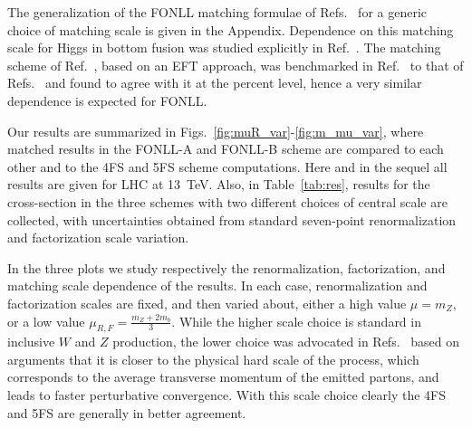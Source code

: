 \documentclass[12pt]{article}
\begin{document}
The generalization of the FONLL matching formulae of
Refs.~\cite{Forte:2015hba,Forte:2016sja} for a generic choice of
matching scale is given in the Appendix.
Dependence on this
matching scale for Higgs in bottom fusion  was studied explicitly in
Ref.~\cite{Bonvini:2015pxa,Bonvini:2016fgf}. The matching scheme of 
Ref.~\cite{Bonvini:2015pxa,Bonvini:2016fgf}, based on an EFT approach,
was benchmarked in Ref.~\cite{deFlorian:2016spz} to that of
Refs.~\cite{Forte:2015hba,Forte:2016sja} and found to agree with it at
the percent level, hence a very similar dependence is expected for
FONLL.


Our results are summarized in
Figs.~\ref{fig:muR_var}-\ref{fig:m_mu_var}, where
matched results in the FONLL-A and FONLL-B scheme are compared to each
other and to the 4FS and 5FS scheme computations. Here and in the
sequel all results are given for LHC at 13~TeV.  Also, in
Table~\ref{tab:res}, results for the cross-section in the
three schemes with two different choices of central scale are
collected, with uncertainties obtained from
standard seven-point renormalization and factorization
scale variation. 


In the three plots
we study respectively the renormalization, factorization, and matching
scale dependence of the results. 
In each
case, renormalization and factorization scales are fixed, and then
varied about, either a high value $\mu=m_Z$, or a low value
$\mu_{R,F}=\frac{m_Z+2m_b}{3}$. While the higher scale choice is standard in
inclusive $W$ and $Z$ production, the lower choice was advocated in
Refs.~\cite{Maltoni:2012pa,Lim:2016wjo} based on arguments 
that it is closer to the physical hard scale of the process, which
corresponds to the average transverse momentum of the emitted partons, 
and leads
to faster perturbative convergence. With this scale choice clearly the
4FS and 5FS are generally in better agreement.
\end{document}

